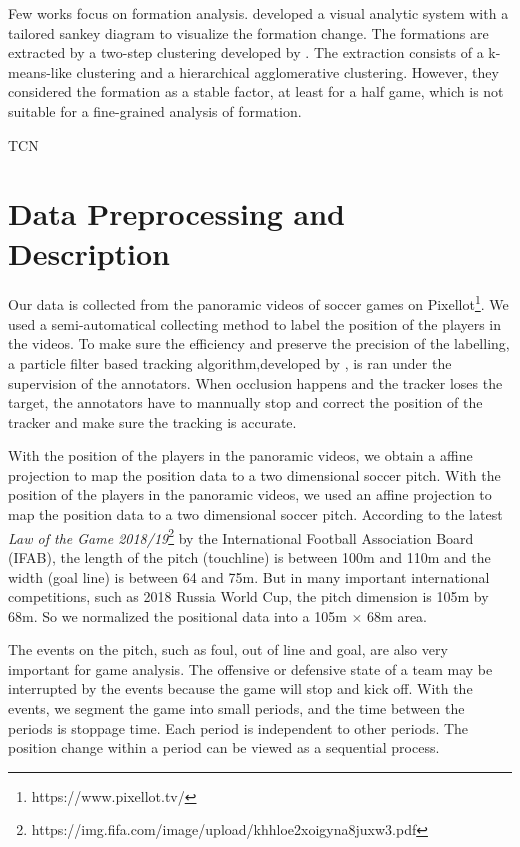 \documentclass{article}
\begin{document}
Few works focus on formation analysis. \cite{wu2019forvizor} developed a visual analytic system with a tailored sankey diagram to visualize the formation change. The formations are extracted by a two-step clustering developed by \cite{bialkowski2014large}. The extraction consists of a k-means-like clustering and a hierarchical agglomerative clustering. However, they considered the formation as a stable factor, at least for a half game, which is not suitable for a fine-grained analysis of formation.

TCN

\section{Data Preprocessing and Description}
Our data is collected from the panoramic videos of soccer games on Pixellot\footnote{https://www.pixellot.tv/}. We used a semi-automatical collecting method to label the position of the players in the videos. To make sure the efficiency and preserve the precision of the labelling, a particle filter based tracking algorithm,developed by \cite{dearden2006tracking}, is ran under the supervision of the annotators. When occlusion happens and the tracker loses the target, the annotators have to mannually stop and correct the position of the tracker and make sure the tracking is accurate.

With the position of the players in the panoramic videos, we obtain a affine projection to map the position data to a two dimensional soccer pitch. With the position of the players in the panoramic videos, we used an affine projection to map the position data to a two dimensional soccer pitch. 
According to the latest \emph{Law of the Game 2018/19}\footnote{https://img.fifa.com/image/upload/khhloe2xoigyna8juxw3.pdf} by the International Football Association Board (IFAB), the length of the pitch (touchline) is between 100m and 110m and the width (goal line) is between 64 and 75m. But in many important international competitions, such as 2018 Russia World Cup, the pitch dimension is 105m by 68m. So we normalized the positional data into a 105m $\times$ 68m area.

The events on the pitch, such as foul, out of line and goal, are also very important for game analysis. The offensive or defensive state of a team may be interrupted by the events because the game will stop and kick off. With the events, we segment the game into small periods, and the time between the periods is stoppage time. Each period is independent to other periods. The position change within a period can be viewed as a sequential process.
\end{document}
